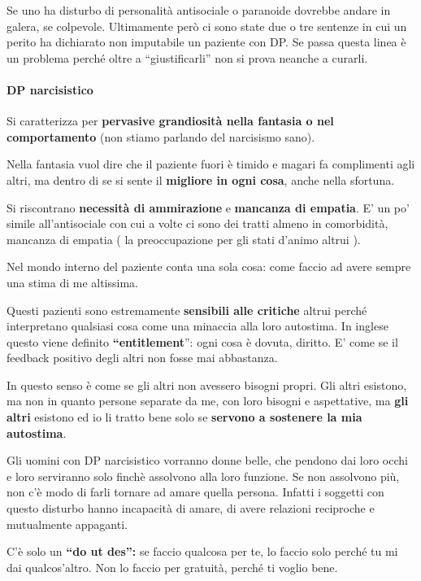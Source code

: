 Se uno ha disturbo di personalità antisociale o paranoide dovrebbe
andare in galera, se colpevole. Ultimamente però ci sono state due o tre
sentenze in cui un perito ha dichiarato non imputabile un paziente con
DP. Se passa questa linea è un problema perché oltre a ``giustificarli''
non si prova neanche a curarli.

\paragraph{DP narcisistico}

Si caratterizza per \textbf{pervasive grandiosità nella fantasia o nel
comportamento} (non stiamo parlando del narcisismo sano).

Nella fantasia vuol dire che il paziente fuori è timido e magari fa
complimenti agli altri, ma dentro di se si sente il \textbf{migliore in
ogni cosa}, anche nella sfortuna.

Si riscontrano \textbf{necessità di ammirazione} e \textbf{mancanza di
empatia}. E' un po' simile all'antisociale con cui a volte ci sono dei
tratti almeno in comorbidità, mancanza di empatia ( la preoccupazione
per gli stati d'animo altrui ).

Nel mondo interno del paziente conta una sola cosa: come faccio ad avere
sempre una stima di me altissima.

Questi pazienti sono estremamente \textbf{sensibili alle critiche}
altrui perché interpretano qualsiasi cosa come una minaccia alla loro
autostima. In inglese questo viene definito \textbf{``entitlement}'':
ogni cosa è dovuta, diritto. E' come se il feedback positivo degli altri
non fosse mai abbastanza.

In questo senso è come se gli altri non avessero bisogni propri. Gli
altri esistono, ma non in quanto persone separate da me, con loro
bisogni e aspettative, ma \textbf{gli altri} esistono ed io li tratto
bene solo se \textbf{servono a sostenere la mia autostima}.

Gli uomini con DP narcisistico vorranno donne belle, che pendono dai
loro occhi e loro serviranno solo finchè assolvono alla loro funzione.
Se non assolvono più, non c'è modo di farli tornare ad amare quella
persona. Infatti i soggetti con questo disturbo hanno incapacità di
amare, di avere relazioni reciproche e mutualmente appaganti.

C'è solo un \textbf{``do ut des'':} se faccio qualcosa per te, lo faccio
solo perché tu mi dai qualcos'altro. Non lo faccio per gratuità, perché
ti voglio bene.

